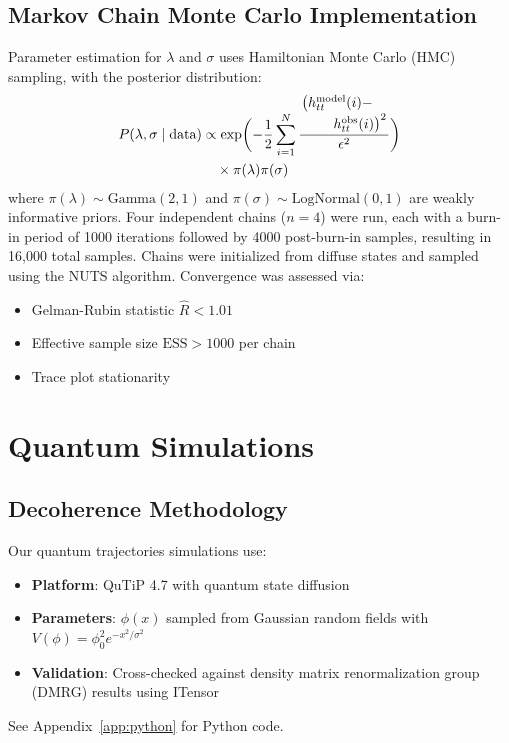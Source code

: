 \documentclass[twocolumn]{article}
\begin{document}
	\subsection{Markov Chain Monte Carlo Implementation}\label{app:mcmc}
	Parameter estimation for \( \lambda \) and \( \sigma \) uses Hamiltonian Monte Carlo (HMC) sampling\cite{neal2011}, with the posterior distribution: 
	\begin{equation}
		\begin{split}
			P(\lambda, \sigma \mid \text{data}) &\propto \exp\biggl(
			-\frac{1}{2} \sum_{i=1}^N \frac{\splitfrac{\bigl(h_{tt}^{\text{model}}(i) - }{h_{tt}^{\text{obs}}(i)\bigr)^2}}{\epsilon^2} \biggr) \\
			&\quad \times \pi(\lambda) \pi(\sigma)
		\end{split}
	\end{equation}
	where \( \pi(\lambda) \sim \text{Gamma}(2, 1) \) and \( \pi(\sigma) \sim \text{LogNormal}(0, 1) \) are weakly informative priors. Four independent chains (\( n = 4 \)) were run, each with a burn-in period of 1000 iterations followed by 4000 post-burn-in samples, resulting in 16,000 total samples. Chains were initialized from diffuse states and sampled using the NUTS algorithm\cite{hoffman2014}. Convergence was assessed via:  
	\begin{itemize}
		\item Gelman-Rubin statistic \( \hat{R} < 1.01 \)  
		\item Effective sample size \( \text{ESS} > 1000 \) per chain  
		\item Trace plot stationarity  
	\end{itemize}
	
	\FloatBarrier%
	\section{Quantum Simulations}\label{app:quantum}
	
	\subsection{Decoherence Methodology}\label{subsec:sim_methods}
	Our quantum trajectories simulations use:
	\begin{itemize}
		\item \textbf{Platform}: QuTiP 4.7\cite{Johansson2013} with quantum state diffusion
		\item \textbf{Parameters}: $\phi(x)$ sampled from Gaussian random fields with $V(\phi)=\phi_0^2e^{-x^2/\sigma^2}$
		\item \textbf{Validation}: Cross-checked against density matrix renormalization group (DMRG) results using ITensor\cite{ITensor2020}
	\end{itemize}
	See Appendix~\ref{app:python} for Python code.
	
\end{document}

